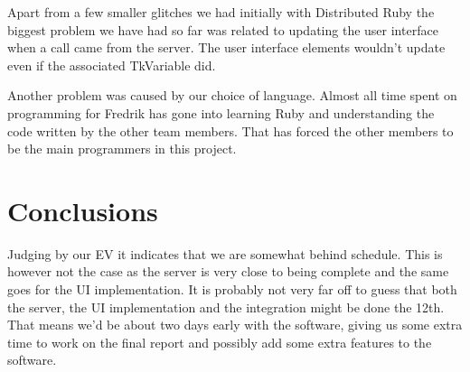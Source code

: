 \documentclass[10pt, titlepage, oneside, a4paper]{article}
\begin{document}
	Apart from a few smaller glitches we had initially with Distributed Ruby the biggest problem we have had so far was related to updating the user interface when a call came from the server. The user interface elements wouldn't update even if the associated TkVariable did.

	Another problem was caused by our choice of language. Almost all time spent on programming for Fredrik has gone into learning Ruby and understanding the code written by the other team members. That has forced the other members to be the main programmers in this project.
	
	\section{Conclusions}
	Judging by our EV it indicates that we are somewhat behind schedule. This is however not the case as the server is very close to being complete and the same goes for the UI implementation. It is probably not very far off to guess that both the server, the UI implementation and the integration might be done the 12th. That means we'd be about two days early with the software, giving us some extra time to work on the final report and possibly add some extra features to the software.

\clearpage
\appendix
\printglossary
	
\end{document}
